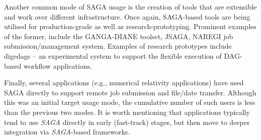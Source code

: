 \documentclass[a4paper,10pt]{article}
\newcommand{\sagaimpl}{\textit{SAGA}\xspace}
\newcommand{\impl}{\sagaimpl}
\begin{document}
 Another common mode of SAGA usage is the creation of tools that are
 extensible and work over different infrastructure. Once again,
 SAGA-based tools are being utilised for production-grade as well as
 research-prototyping. Prominent examples of the former, include the
 GANGA-DIANE toolset, JSAGA, NAREGI job submission/management system.
 Examples of research prototypes include digedags -- an experimental
 system to support the flexible execution of DAG-based workflow
 applications.

 Finally, several applications (e.g., numerical relativity
 applications) have used SAGA directly to support remote job
 submission and file/date transfer. Although this was an initial
 target usage mode, the cumulative number of such users is less than
 the previous two modes. It is worth mentioning that applications
 typically tend to use \impl directly in early (fast-track) stages, but
 then move to deeper integration via \impl-based frameworks.  \vspace{-0.8em}
 \pagebreak
\end{document}
